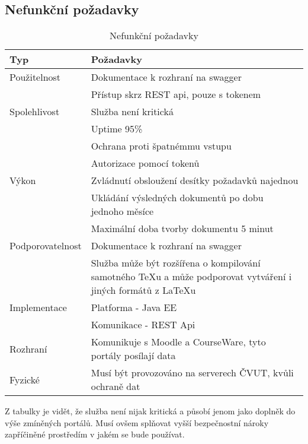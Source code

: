  \subsection{Nefunkční požadavky}
 
 \begin{table}[H]
 	\begin{center}
 		\begin{tabular}{ p{4cm} P{8,6cm} }
 			\textbf{Typ} & \textbf{Požadavky} \\
 			\midrule[0,15em]
 			Použitelnost & \tabitem Dokumentace k rozhraní na swagger\\
 						& \tabitem Přístup skrz REST api, pouze s tokenem\\
 			\midrule		
 			Spolehlivost & \tabitem Služba není kritická\\
 						& \tabitem Uptime 95\%\\
 						& \tabitem Ochrana proti špatnémmu vstupu\\
 						& \tabitem Autorizace pomocí tokenů\\
 			\midrule
 			Výkon & \tabitem Zvládnutí obsloužení desítky požadavků najednou\\
 						& \tabitem Ukládání výsledných dokumentů po dobu jednoho měsíce\\
 						& \tabitem Maximální doba tvorby dokumentu 5 minut\\	
			\midrule
			Podporovatelnost & \tabitem Dokumentace k rozhraní na swagger\\
							& \tabitem Služba může být rozšířena o kompilování samotného TeXu a může podporovat vytváření i jiných formátů z LaTeXu\\	
			\midrule
			Implementace & \tabitem Platforma - Java EE\\
						& \tabitem Komunikace - REST Api\\
			\midrule
 			Rozhraní & \tabitem Komunikuje s Moodle a CourseWare, tyto portály posílají data\\
 			\midrule
 			Fyzické & \tabitem Musí být provozováno na serverech ČVUT, kvůli ochraně dat\\
 	\end{tabular}
 	\end{center}
 	\caption{Nefunkční požadavky}
 	\label{tab:errors}
 \end{table}
 
 Z tabulky je vidět, že služba není nijak kritická a působí jenom jako doplněk do výše zmíněných portálů. Musí ovšem splňovat vyšší bezpečnostní nároky zapříčiněné prostředím v jakém se bude používat. 

